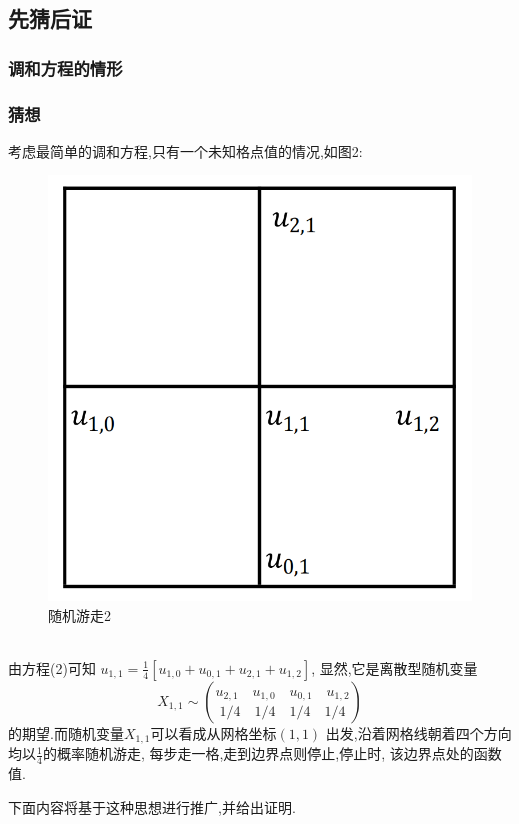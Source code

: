 \documentclass[UTF8,a4paper,notitlepage]{ctexart}%
\theoremstyle{nonumberplain}
\begin{document}
\subsection{先猜后证}
\subsubsection{调和方程的情形}
\subsubsection*{猜想}
考虑最简单的调和方程,只有一个未知格点值的情况,如图2:
\begin{figure}[ht]%
    \centering
    \includegraphics[scale=0.3]{tp1.png}
\caption{随机游走2}\label{fig:tp1}
\end{figure}\\
由方程(2)可知
$u_{1,1}=\frac{1}{4}[u_{1,0}+u_{0,1}+u_{2,1}+u_{1,2}]$,
显然,它是离散型随机变量
\begin{equation*}
    X_{1,1}\sim \binom{u_{2,1}\quad u_{1,0}\quad u_{0,1}\quad u_{1,2}}{1/4 \quad 1/4 \quad 1/4 \quad 1/4 } 
\end{equation*}
的期望.而随机变量$X_{1,1}$可以看成从网格坐标$(1,1)$
出发,沿着网格线朝着四个方向均以$\frac{1}{4}$的概率随机游走,
每步走一格,走到边界点则停止,停止时,
该边界点处的函数值.\par
下面内容将基于这种思想进行推广,并给出证明.
\end{document}
